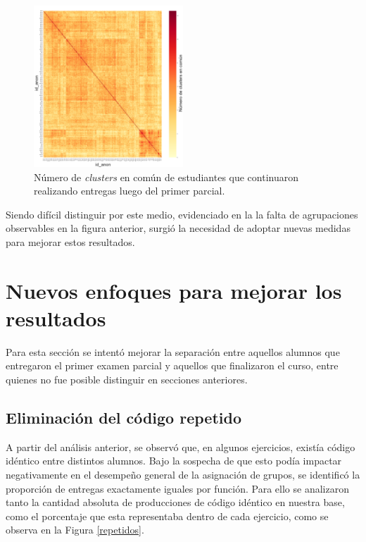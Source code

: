 \documentclass[11pt,a4paper,twoside,openany]{tesis}
\begin{document}
\begin{figure}[H]
    \centering
    \includegraphics[width=0.5\textwidth]{imagenes/clusters-no-13.png}
    \caption{Número de  \emph{clusters} en común de estudiantes que continuaron realizando entregas luego del primer parcial.}
    \label{cluster2}
\end{figure}

Siendo difícil distinguir por este medio, evidenciado en la la falta de agrupaciones observables en la figura anterior, surgió la necesidad de adoptar nuevas medidas para mejorar estos resultados.

\section{Nuevos enfoques para mejorar los resultados}

Para esta sección se intentó mejorar la separación entre aquellos alumnos que entregaron el primer examen parcial y aquellos que finalizaron el curso, entre quienes no fue posible distinguir en secciones anteriores. 

\subsection{Eliminación del código repetido}

A partir del análisis anterior, se observó que, en algunos ejercicios, existía código idéntico entre distintos alumnos. Bajo la sospecha de que esto podía impactar negativamente en el desempeño general de la asignación de grupos, se identificó la proporción de entregas exactamente iguales por función. Para ello se analizaron tanto la cantidad absoluta de producciones de código idéntico en nuestra base, como el porcentaje que esta representaba dentro de cada ejercicio, como se observa en la Figura \ref{repetidos}. 
\end{document}
